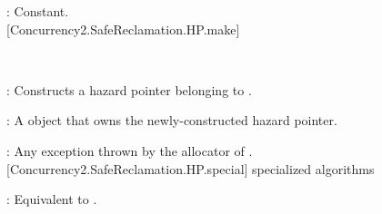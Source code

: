 \pnum
{}: Constant.
\\

[Concurrency2.SafeReclamation.HP.make]{}

\\
\hspace*{1.1em}

\pnum
{}: Constructs a hazard pointer belonging to .

\pnum
{}: A  object that owns the newly-constructed hazard pointer.

\pnum
{}: Any exception thrown by the allocator of .
\\

[Concurrency2.SafeReclamation.HP.special]{ specialized algorithms}


\pnum
{}: Equivalent to .
\\
